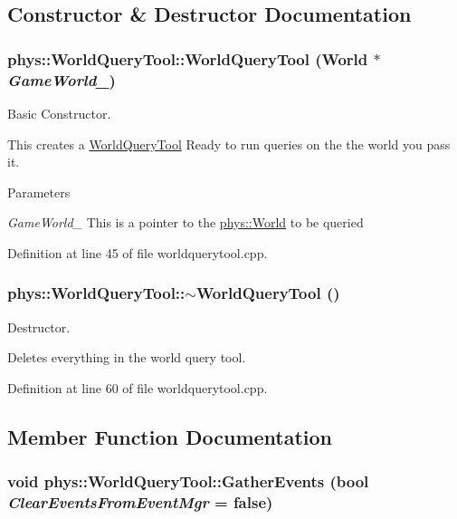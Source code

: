\subsection{Constructor \& Destructor Documentation}
\hypertarget{classphys_1_1WorldQueryTool_a6b156ab7ea6236402c40467da7f11c0d}{
\subsubsection[{WorldQueryTool}]{\setlength{\rightskip}{0pt plus 5cm}phys::WorldQueryTool::WorldQueryTool ({\bf World} $\ast$ {\em GameWorld\_\-})}}
\label{d8/d69/classphys_1_1WorldQueryTool_a6b156ab7ea6236402c40467da7f11c0d}


Basic Constructor. 

This creates a \hyperlink{classphys_1_1WorldQueryTool}{WorldQueryTool} Ready to run queries on the the world you pass it. 
\begin{DoxyParams}{Parameters}
\item[{\em GameWorld\_\-}]This is a pointer to the \hyperlink{classphys_1_1World}{phys::World} to be queried \end{DoxyParams}


Definition at line 45 of file worldquerytool.cpp.

\hypertarget{classphys_1_1WorldQueryTool_ace36ffebcabbbf0553c517820bc636c9}{
\subsubsection[{$\sim$WorldQueryTool}]{\setlength{\rightskip}{0pt plus 5cm}phys::WorldQueryTool::$\sim$WorldQueryTool ()}}
\label{d8/d69/classphys_1_1WorldQueryTool_ace36ffebcabbbf0553c517820bc636c9}


Destructor. 

Deletes everything in the world query tool. 

Definition at line 60 of file worldquerytool.cpp.



\subsection{Member Function Documentation}
\hypertarget{classphys_1_1WorldQueryTool_ae387ff047f3cdf408d8959b8cbf4cc57}{
\subsubsection[{GatherEvents}]{\setlength{\rightskip}{0pt plus 5cm}void phys::WorldQueryTool::GatherEvents (bool {\em ClearEventsFromEventMgr} = {\ttfamily false})}}
\label{d8/d69/classphys_1_1WorldQueryTool_ae387ff047f3cdf408d8959b8cbf4cc57}


